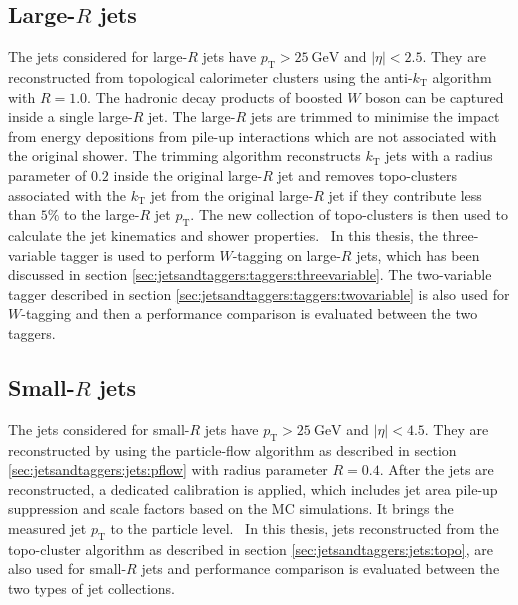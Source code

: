 \subsection*{Large-$R$ jets}%
\label{sec:analysisstrategy:physicsobjets:largerjets}
The jets considered for large-$R$ jets have $p_{\text{T}} > \SI{25}{\giga\electronvolt}$ and $|\eta| < 2.5$. They are reconstructed from topological calorimeter clusters using the anti-$k_{\text{T}}$ algorithm with $R=1.0$. The hadronic decay products of boosted $W$ boson can be captured inside a single large-$R$ jet. The large-$R$ jets are trimmed to minimise the impact from energy depositions from pile-up interactions which are not associated with the original shower. The trimming algorithm reconstructs $k_{\text{T}}$ jets with a radius parameter of $0.2$ inside the original large-$R$ jet and removes topo-clusters associated with the $k_{\text{T}}$ jet from the original large-$R$ jet if they contribute less than $5\%$ to the large-$R$ jet $p_{\text{T}}$. The new collection of topo-clusters is then used to calculate the jet kinematics and shower properties.~\cite{thesis:rui} In this thesis, the three-variable tagger is used to perform $W$-tagging on large-$R$ jets, which has been discussed in section \ref{sec:jetsandtaggers:taggers:threevariable}. The two-variable tagger described in section \ref{sec:jetsandtaggers:taggers:twovariable} is also used for $W$-tagging and then a performance comparison is evaluated between the two taggers.

\subsection*{Small-$R$ jets}%
\label{sec:analysisstrategy:physicsobjets:smallrjets}
The jets considered for small-$R$ jets have $p_{\text{T}} > \SI{25}{\giga\electronvolt}$ and $|\eta| < 4.5$. They are reconstructed by using the particle-flow algorithm as described in section \ref{sec:jetsandtaggers:jets:pflow} with radius parameter $R=0.4$. After the jets are reconstructed, a dedicated calibration is applied, which includes jet area pile-up suppression and scale factors based on the MC simulations. It brings the measured jet $p_{\text{T}}$ to the particle level.~\cite{thesis:rui} In this thesis, jets reconstructed from the topo-cluster algorithm as described in section \ref{sec:jetsandtaggers:jets:topo}, are also used for small-$R$ jets and performance comparison is evaluated between the two types of jet collections.


